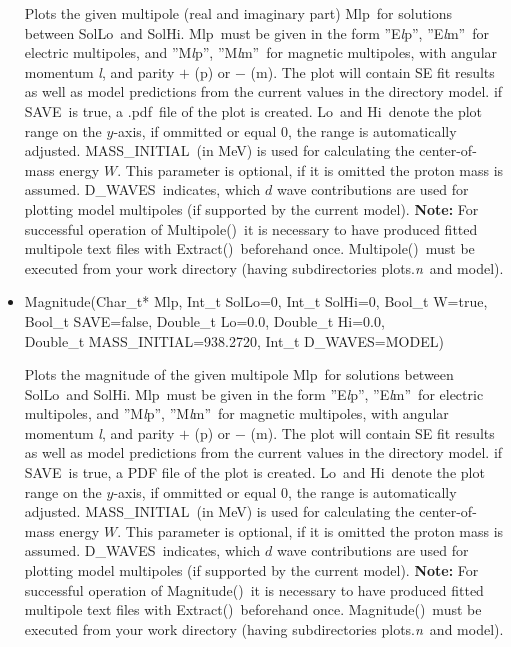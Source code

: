 \documentclass[a4paper,10pt]{article}
\def\tt{\ttfamily}
\def\rm{\rmfamily}
\begin{document}
\begin{itemize}
Plots the given multipole (real and imaginary part) \tt Mlp\rm\ for solutions between \tt SolLo\rm\ and \tt SolHi\rm.
\tt Mlp\rm\ must be given in the form \tt ''E\textit{l}p''\rm,
\tt ''E\textit{l}m''\rm\ 
for electric multipoles, and
\tt ''M\textit{l}p''\rm,
\tt ''M\textit{l}m''\rm\ 
for magnetic multipoles, with angular momentum \tt\textit{l}\rm, and parity
$+$ (\tt p\rm) or $-$ (\tt m\rm). The plot will contain SE fit results as well as model predictions from the current
values in the directory \tt model\rm.
if \tt SAVE\rm\ is true, a \tt.pdf\rm\ file of the plot is created. \tt Lo\rm\ and \tt Hi\rm\ denote the plot range on the $y$-axis, 
if ommitted or equal 0, the range is automatically adjusted.
\tt MASS\_INITIAL\rm\ (in MeV) is used for calculating the center-of-mass energy $W$. This parameter 
is optional, if it is omitted the proton mass is assumed.
\tt D\_WAVES\rm\ indicates, which $d$ wave contributions are used for plotting model multipoles (if supported by the current model).
\textbf{Note:} For successful operation of \tt Multipole()\rm\ it is necessary to have produced
fitted multipole text files with \tt Extract()\rm\ beforehand once. \tt Multipole()\rm\ must be executed from your
work directory (having subdirectories \tt plots.\textit{n}\rm\ and \tt model\rm).

\item
\tt Magnitude(Char\_t* Mlp, Int\_t SolLo=0, Int\_t SolHi=0, Bool\_t W=true,\\
\phantom{Magnitude(}Bool\_t SAVE=false, Double\_t Lo=0.0, Double\_t Hi=0.0,\\
\phantom{Magnitude(}Double\_t MASS\_INITIAL=938.2720, Int\_t D\_WAVES=MODEL)\rm

Plots the magnitude of the given multipole \tt Mlp\rm\ for solutions between \tt SolLo\rm\ and \tt SolHi\rm.
\tt Mlp\rm\ must be given in the form \tt ''E\textit{l}p''\rm,
\tt ''E\textit{l}m''\rm\ 
for electric multipoles, and
\tt ''M\textit{l}p''\rm,
\tt ''M\textit{l}m''\rm\ 
for magnetic multipoles, with angular momentum \tt\textit{l}\rm, and parity
$+$ (\tt p\rm) or $-$ (\tt m\rm). The plot will contain SE fit results as well as model predictions from the current
values in the directory \tt model\rm.
if \tt SAVE\rm\ is true, a PDF file of the plot is created. \tt Lo\rm\ and \tt Hi\rm\ denote the plot range on the $y$-axis, 
if ommitted or equal 0, the range is automatically adjusted.
\tt MASS\_INITIAL\rm\ (in MeV) is used for calculating the center-of-mass energy $W$. This parameter 
is optional, if it is omitted the proton mass is assumed.
\tt D\_WAVES\rm\ indicates, which $d$ wave contributions are used for plotting model multipoles (if supported by the current model).
\textbf{Note:} For successful operation of \tt Magnitude()\rm\ it is necessary to have produced
fitted multipole text files with \tt Extract()\rm\ beforehand once. \tt Magnitude()\rm\ must be executed from your
work directory (having subdirectories \tt plots.\textit{n}\rm\ and \tt model\rm).


\end{itemize}
\end{document}
